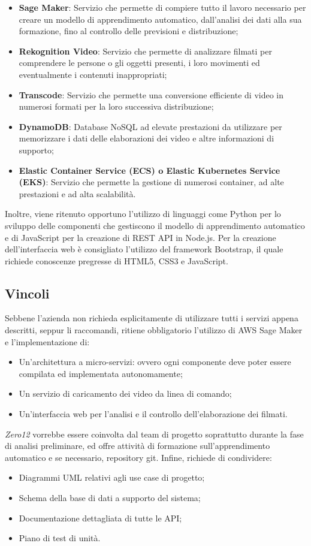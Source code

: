 \begin{itemize}
\item \textbf{Sage Maker}: Servizio che permette di compiere tutto il lavoro necessario per creare un modello di apprendimento automatico, dall'analisi dei dati alla sua formazione, fino al controllo delle previsioni e distribuzione;
\item \textbf{Rekognition Video}: Servizio che permette di analizzare filmati per comprendere le persone o gli oggetti presenti, i loro movimenti ed eventualmente i contenuti inappropriati;
\item \textbf{Transcode}: Servizio che permette una conversione efficiente di video in numerosi formati per la loro successiva distribuzione;
\item \textbf{DynamoDB}: Database NoSQL ad elevate prestazioni da utilizzare per memorizzare i dati delle elaborazioni dei video e altre informazioni di supporto;
\item \textbf{Elastic Container Service (ECS) o Elastic Kubernetes Service (EKS)}: Servizio che permette la gestione di numerosi container, ad alte prestazioni e ad alta scalabilit\`a.
\end{itemize}
Inoltre, viene ritenuto opportuno l'utilizzo di linguaggi come Python per lo sviluppo delle componenti che gestiscono il modello di apprendimento automatico e di JavaScript per la creazione di REST API in Node.js. Per la creazione dell'interfaccia web \`e consigliato l'utilizzo del framework Bootstrap, il quale richiede conoscenze pregresse di HTML5, CSS3 e JavaScript.

\subsection{Vincoli}
Sebbene l'azienda non richieda esplicitamente di utilizzare tutti i servizi appena descritti, seppur li raccomandi, ritiene obbligatorio l'utilizzo di AWS Sage Maker e l'implementazione di:

\begin{itemize}
\item Un'architettura a micro-servizi: ovvero ogni componente deve poter essere compilata ed implementata autonomamente;
\item Un servizio di caricamento dei video da linea di comando;
\item Un'interfaccia web per l'analisi e il controllo dell'elaborazione dei filmati.
\end{itemize}
\textit{Zero12} vorrebbe essere coinvolta dal team di progetto soprattutto durante la fase di analisi preliminare, ed offre attività di formazione sull'apprendimento automatico e se necessario, repository git.
Infine, richiede di condividere:
\begin{itemize}
\item Diagrammi UML relativi agli use case di progetto;
\item Schema della base di dati a supporto del sistema;
\item Documentazione dettagliata di tutte le API;
\item Piano di test di unità.
\end{itemize}

